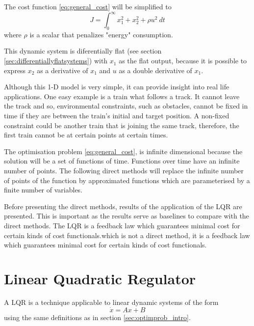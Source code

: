 \par The cost function \ref{eq:general_cost} will be simplified to
\begin{equation}
    J = \int_0^\infty x_1^2 + x_2^2 + \rho u^2\  dt
    \label{eq:my_cost}
\end{equation}
where $\rho$ is a scalar that penalizes "energy" consumption.
\par This dynamic system is diferentially flat (see section \ref{sec:differentiallyflatsystems}) with $x_1$ as the flat output, because it is possible to express $x_2$ as a derivative of $x_1$ and $u$ as a double derivative of $x_1$.
\par Although this 1-D model is very simple, it can provide insight into real life applications. One easy example is a train what follows a track. It cannot leave the track and so, environmental constraints, such as obstacles, cannot be fixed in time if they are between the train's initial and target position. A non-fixed constraint could be another train that is joining the same track, therefore, the first train cannot be at certain points at certain times.
\par The optimisation problem \eqref{eq:general_cost}, is infinite dimensional because the solution will be a set of functions of time. Functions over time have an infinite number of points. The following direct methods will replace the infinite number of points of the function by approximated functions which are parameterised by a finite number of variables.
\par Before presenting the direct methods, results of the application of the \acl{LQR} are presented. This is important as the results serve as baselines to compare with the direct methods. The \ac{LQR} is a feedback law which guarantees minimal cost for certain kinds of cost functionals.which is not a direct method, it is a feedback law which guarantees minimal cost for certain kinds of cost functionals.

\section{Linear Quadratic Regulator}

\par A \acl{LQR} is a technique applicable to linear dynamic systems of the form
\begin{equation}
    \label{eq:dynamic_system}
    \dot{x} = A x + B
\end{equation}
using the same definitions as in section \ref{sec:optimprob_intro}.

